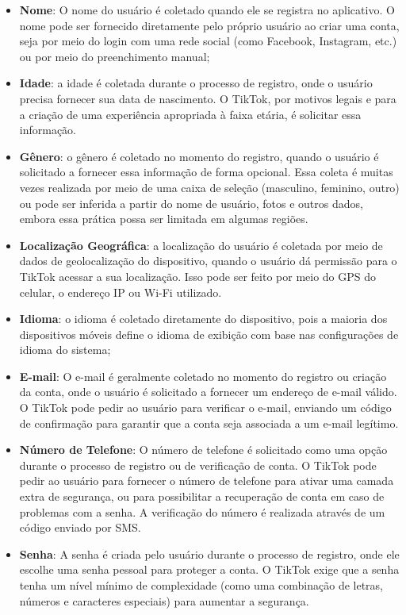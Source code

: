 \begin{itemize}
    \item \textbf{Nome}: O nome do usuário é coletado quando ele se registra no aplicativo. O nome pode ser fornecido diretamente pelo próprio usuário ao criar uma conta, seja por meio do login com uma rede social (como Facebook, Instagram, etc.) ou por meio do preenchimento manual;
    \item \textbf{Idade}: a idade é coletada durante o processo de registro, onde o usuário precisa fornecer sua data de nascimento. O TikTok, por motivos legais e para a criação de uma experiência apropriada à faixa etária, é solicitar essa informação.
    \item \textbf{Gênero}: o gênero é coletado no momento do registro, quando o usuário é solicitado a fornecer essa informação de forma opcional. Essa coleta é muitas vezes realizada por meio de uma caixa de seleção (masculino, feminino, outro) ou pode ser inferida a partir do nome de usuário, fotos e outros dados, embora essa prática possa ser limitada em algumas regiões.
    \item \textbf{Localização Geográfica}: a localização do usuário é coletada por meio de dados de geolocalização do dispositivo, quando o usuário dá permissão para o TikTok acessar a sua localização. Isso pode ser feito por meio do GPS do celular, o endereço IP ou Wi-Fi utilizado.
    \item \textbf{Idioma}: o idioma é coletado diretamente do dispositivo, pois a maioria dos dispositivos móveis define o idioma de exibição com base nas configurações de idioma do sistema;
    
    \newpage
    \item \textbf{E-mail}: O e-mail é geralmente coletado no momento do registro ou criação da conta, onde o usuário é solicitado a fornecer um endereço de e-mail válido. O TikTok pode pedir ao usuário para verificar o e-mail, enviando um código de confirmação para garantir que a conta seja associada a um e-mail legítimo.
    \item \textbf{Número de Telefone}: O número de telefone é solicitado como uma opção durante o processo de registro ou de verificação de conta. O TikTok pode pedir ao usuário para fornecer o número de telefone para ativar uma camada extra de segurança, ou para possibilitar a recuperação de conta em caso de problemas com a senha. A verificação do número é realizada através de um código enviado por SMS.
    \item \textbf{Senha}: A senha é criada pelo usuário durante o processo de registro, onde ele escolhe uma senha pessoal para proteger a conta. O TikTok exige que a senha tenha um nível mínimo de complexidade (como uma combinação de letras, números e caracteres especiais) para aumentar a segurança.
\end{itemize}



